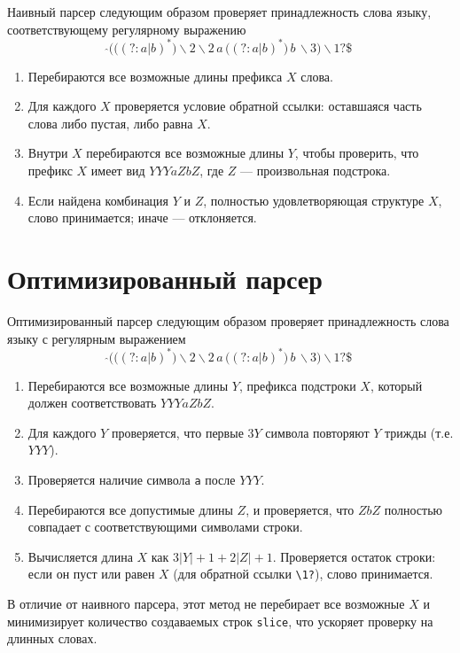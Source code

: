 \documentclass[a4paper, 14pt]{extarticle}
\begin{document}
Наивный парсер следующим образом проверяет принадлежность слова языку, соответствующему регулярному выражению 
\[
\hat{ } \Big( \big( (?: a | b)^* \big) \backslash 2 \backslash 2 \, a \, \big( (?: a | b)^* \big) \, b \, \backslash 3 \Big) \backslash 1? \$
\]

\begin{enumerate}
    \item Перебираются все возможные длины префикса $X$ слова.
    \item Для каждого $X$ проверяется условие обратной ссылки: оставшаяся часть слова либо пустая, либо равна $X$.
    \item Внутри $X$ перебираются все возможные длины $Y$, чтобы проверить, что префикс $X$ имеет вид $YYY a Z b Z$, где $Z$ — произвольная подстрока.
    \item Если найдена комбинация $Y$ и $Z$, полностью удовлетворяющая структуре $X$, слово принимается; иначе — отклоняется.
\end{enumerate}

\section{Оптимизированный парсер}

Оптимизированный парсер следующим образом проверяет принадлежность слова языку с регулярным выражением
\[
\hat{ } \Big( \big( (?: a | b)^* \big) \backslash 2 \backslash 2 \, a \, \big( (?: a | b)^* \big) \, b \, \backslash 3 \Big) \backslash 1? \$
\]

\begin{enumerate}
    \item Перебираются все возможные длины $Y$, префикса подстроки $X$, который должен соответствовать $YYY a Z b Z$.
    \item Для каждого $Y$ проверяется, что первые $3Y$ символа повторяют $Y$ трижды (т.е. $YYY$).
    \item Проверяется наличие символа \texttt{a} после $YYY$.
    \item Перебираются все допустимые длины $Z$, и проверяется, что $Z b Z$ полностью совпадает с соответствующими символами строки.
    \item Вычисляется длина $X$ как $3|Y| + 1 + 2|Z| + 1$. Проверяется остаток строки: если он пуст или равен $X$ (для обратной ссылки \texttt{\textbackslash 1?}), слово принимается.
\end{enumerate}

В отличие от наивного парсера, этот метод не перебирает все возможные $X$ и минимизирует количество создаваемых строк \texttt{slice}, что ускоряет проверку на длинных словах.
\end{document}

